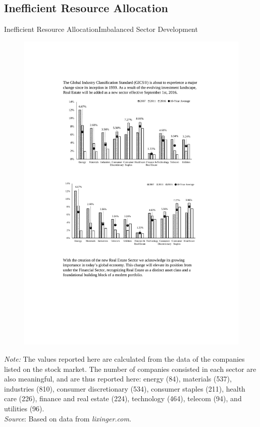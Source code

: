 \documentclass{beamer}
\begin{document}
\subsection{Inefficient Resource Allocation}
\begin{frame}{Inefficient Resource Allocation}{Imbalanced Sector Development}
\begin{figure}
\centering
\includegraphics[scale=.75]{fig/roa-cn.pdf}
\end{figure}
\tiny
\emph{Note:} 
The values reported here are calculated from the data of the companies listed 
on the stock market. The number of companies consisted in each sector are 
also meaningful, and are thus reported here: energy (84), materials (537), 
industries (810), consumer discretionary (534), consumer staples (211), 
health care (226), finance and real estate (224), technology (464), 
telecom (94), and utilities (96).\\
\emph{Source}:
Based on data from \textit{lixinger.com}.
\end{frame}
\end{document}
